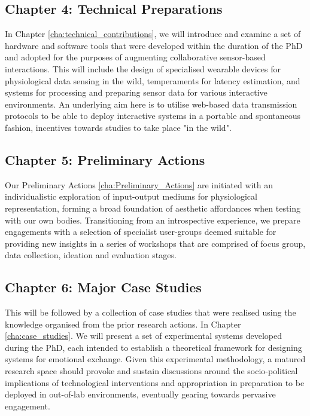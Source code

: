 \subsection{Chapter 4: Technical Preparations}

In Chapter \ref{cha:technical_contributions}, we will introduce and examine a set of hardware and software tools that were developed within the duration of the PhD and adopted for the purposes of augmenting collaborative sensor-based interactions. This will include the design of specialised wearable devices for physiological data sensing in the wild, temperaments for latency estimation, and systems for processing and preparing sensor data for various interactive environments. An underlying aim here is to utilise web-based data transmission protocols to be able to deploy interactive systems in a portable and spontaneous fashion, incentives towards studies to take place "in the wild".

\subsection{Chapter 5: Preliminary Actions}

Our Preliminary Actions \ref{cha:Preliminary_Actions} are initiated with an individualistic exploration of input-output mediums for physiological representation, forming a broad foundation of aesthetic affordances when testing with our own bodies. Transitioning from an introspective experience, we prepare engagements with a selection of specialist user-groups deemed suitable for providing new insights in a series of workshops that are comprised of focus group, data collection, ideation and evaluation stages.

\subsection{Chapter 6: Major Case Studies}

This will be followed by a collection of case studies that were realised using the knowledge organised from the prior research actions. In Chapter \ref{cha:case_studies}. We will present a set of experimental systems developed during the PhD, each intended to establish a theoretical framework for designing systems for emotional exchange. Given this experimental methodology, a matured research space should provoke and sustain discussions around the socio-political implications of technological interventions and appropriation in preparation to be deployed in out-of-lab environments, eventually gearing towards pervasive engagement.

